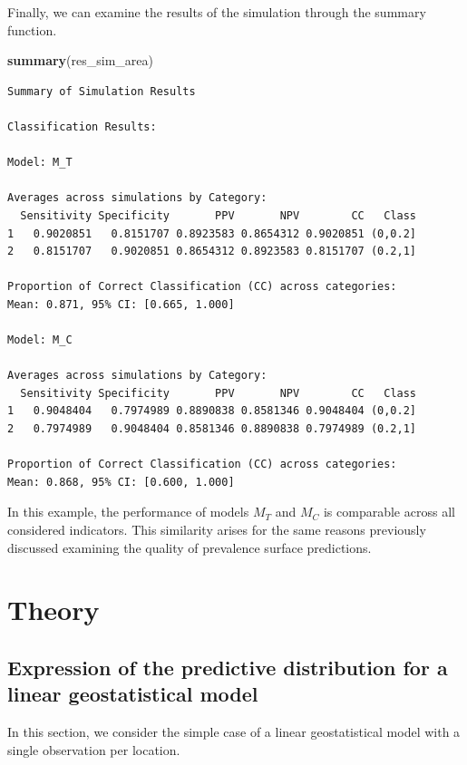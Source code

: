 \documentclass[
  letterpaper,
]{krantz}
\newenvironment{Shaded}{\begin{snugshade}}{\end{snugshade}}
\newcommand{\FunctionTok}[1]{\textcolor[rgb]{0.13,0.29,0.53}{\textbf{#1}}}
\newcommand{\NormalTok}[1]{#1}
\begin{document}
Finally, we can examine the results of the simulation through the
summary function.

\begin{Shaded}
\begin{Highlighting}[]
\FunctionTok{summary}\NormalTok{(res\_sim\_area)}
\end{Highlighting}
\end{Shaded}

\begin{verbatim}
Summary of Simulation Results

Classification Results:

Model: M_T

Averages across simulations by Category:
  Sensitivity Specificity       PPV       NPV        CC   Class
1   0.9020851   0.8151707 0.8923583 0.8654312 0.9020851 (0,0.2]
2   0.8151707   0.9020851 0.8654312 0.8923583 0.8151707 (0.2,1]

Proportion of Correct Classification (CC) across categories:
Mean: 0.871, 95% CI: [0.665, 1.000]

Model: M_C

Averages across simulations by Category:
  Sensitivity Specificity       PPV       NPV        CC   Class
1   0.9048404   0.7974989 0.8890838 0.8581346 0.9048404 (0,0.2]
2   0.7974989   0.9048404 0.8581346 0.8890838 0.7974989 (0.2,1]

Proportion of Correct Classification (CC) across categories:
Mean: 0.868, 95% CI: [0.600, 1.000]
\end{verbatim}

In this example, the performance of models \(M_T\)\hspace{0pt} and
\(M_C\)\hspace{0pt} is comparable across all considered indicators. This
similarity arises for the same reasons previously discussed examining
the quality of prevalence surface predictions.

\section{Theory}\label{sec-theory-prediction}

\subsection{Expression of the predictive distribution for a linear
geostatistical model}\label{sec-pred-distr-theory}

In this section, we consider the simple case of a linear geostatistical
model with a single observation per location.
\end{document}
